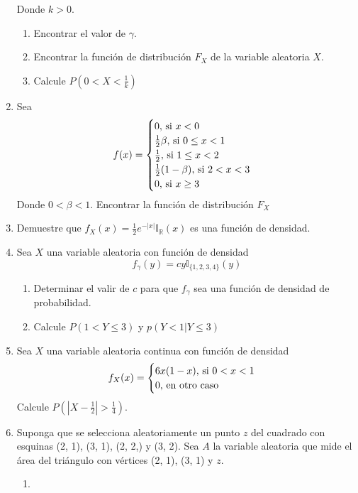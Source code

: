 \documentclass[12pt,a4paper]{report}
\begin{document}
\begin{enumerate}
{		Donde $k > 0$.
		\begin{enumerate}
			\item {
				Encontrar el valor de $\gamma$.
			}
			\item {
				Encontrar la función de distribución $F_X$ de la variable aleatoria
				$X$.
			}
			\item {
				Calcule $P(0 < X < \frac{1}{k})$
			}
		\end{enumerate}
		}
		\item {
			Sea
			\[
				f(x) = \begin{cases}
								0, $ si $ x < 0\\
								\frac{1}{2}\beta, $ si $ 0 \leq x < 1\\
								\frac{1}{2}, $ si $ 1 \leq x < 2\\
								\frac{1}{2}(1-\beta), $ si $ 2 < x < 3\\
								0, $ si $ x \geq 3
						 	 \end{cases}
			\]
			Donde $0 < \beta < 1$. Encontrar la función de distribución $F_X$
		}
		\item {
			Demuestre que $f_X(x) = \frac{1}{2}e^{-|x|}\mathbb{I}_\mathbb{R}(x)$ es
			una función de densidad.
		}
		\item {
			Sea $X$ una variable aleatoria con función de densidad
				\[f_\gamma(y) = cy \mathbb{I}_{\{1, 2, 3, 4\}}(y)\]
				\begin{enumerate}
					\item {
						Determinar el valir de $c$ para que $f_\gamma$ sea una función de
						densidad de probabilidad.
					}
					\item {
						Calcule $P(1 < Y \leq 3)$ y $p(Y < 1 | Y \leq 3)$
					}
				\end{enumerate}
		}
		\item {
			Sea $X$ una variable aleatoria continua con función de densidad
				\[
					f_X(x) = \begin{cases}
										6x(1-x), $ si $ 0 < x < 1\\
										0, $ en otro caso$
									 \end{cases}
				\]
			Calcule $P(|X-\frac{1}{2}| > \frac{1}{4})$.
		}
		\item {
			Suponga que se selecciona aleatoriamente un punto $z$ del cuadrado con
			esquinas (2, 1), (3, 1), (2, 2,) y (3, 2). Sea $A$ la variable aleatoria
			que mide el área del triángulo con vértices (2, 1), (3, 1) y $z$.
			\begin{enumerate}
				\item {
}
\end{enumerate}}
\end{enumerate}
\end{document}
